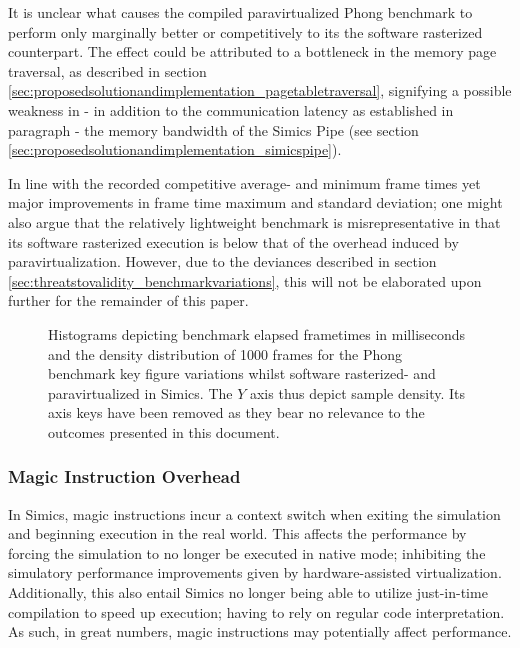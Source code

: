 It is unclear what causes the compiled paravirtualized Phong benchmark to perform only marginally better or competitively to its the software rasterized counterpart.
The effect could be attributed to a bottleneck in the memory page traversal, as described in section \ref{sec:proposedsolutionandimplementation_pagetabletraversal}, signifying a possible weakness in - in addition to the communication latency as established in paragraph  - the memory bandwidth of the Simics Pipe (see section \ref{sec:proposedsolutionandimplementation_simicspipe}).

In line with the recorded competitive average- and minimum frame times yet major improvements in frame time maximum and standard deviation; one might also argue that the relatively lightweight benchmark is misrepresentative in that its software rasterized execution is below that of the overhead induced by paravirtualization.
However, due to the deviances described in section \ref{sec:threatstovalidity_benchmarkvariations}, this will not be elaborated upon further for the remainder of this paper.

\begin{figure}
  \centering
  
  \caption[Benchmark results - paravirtualized in Simics, Phong]{Histograms depicting benchmark elapsed frametimes in milliseconds and the density distribution of 1000 frames for the Phong benchmark key figure variations whilst software rasterized- and paravirtualized in Simics. The $Y$ axis thus depict sample density. Its axis keys have been removed as they bear no relevance to the outcomes presented in this document.}
  \label{fig:histogramssimicsparaphong}
\end{figure}

\subsubsection{Magic Instruction Overhead}
\label{sec:results_magicinstructionoverhead}
In Simics, magic instructions incur a context switch when exiting the simulation and beginning execution in the real world.
This affects the performance by forcing the simulation to no longer be executed in native mode; inhibiting the simulatory performance improvements given by hardware-assisted virtualization.
Additionally, this also entail Simics no longer being able to utilize just-in-time compilation to speed up execution; having to rely on regular code interpretation.
As such, in great numbers, magic instructions may potentially affect performance. 

